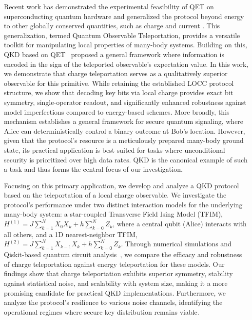 Recent work has demonstrated the experimental feasibility of QET on superconducting quantum hardware \cite{Ikeda2023} and generalized the protocol beyond energy to other globally conserved quantities, such as charge and current \cite{IkedaTeleportingCharge}. This generalization, termed Quantum Observable Teleportation, provides a versatile toolkit for manipulating local properties of many-body systems. Building on this, QKD based on QET~\cite{QKDbyQET} proposed a general framework where information is encoded in the sign of the teleported observable's expectation value. In this work, we demonstrate that charge teleportation serves as a qualitatively superior observable for this primitive. While retaining the established LOCC protocol structure, we show that decoding key bits via local charge provides exact bit symmetry, single-operator readout, and significantly enhanced robustness against model imperfections compared to energy-based schemes. More broadly, this mechanism establishes a general framework for secure quantum signaling, where Alice can deterministically control a binary outcome at Bob's location. However, given that the protocol's resource is a meticulously prepared many-body ground state, its practical application is best suited for tasks where unconditional security is prioritized over high data rates. QKD is the canonical example of such a task and thus forms the central focus of our investigation.

Focusing on this primary application, we develop and analyze a QKD protocol based on the teleportation of a local charge observable. We investigate the protocol's performance under two distinct interaction models for the underlying many-body system: a star-coupled Transverse Field Ising Model (TFIM), $H^{(1)} = J\sum_{k=1}^{N}X_{0}X_{k}+h\sum_{k=0}^{N}Z_{k}$, where a central qubit (Alice) interacts with all others, and a 1D nearest-neighbor TFIM, $H^{(2)} = J\sum_{k=1}^{N}X_{k-1}X_{k}+h\sum_{k=0}^{N}Z_{k}$. Through numerical simulations and Qiskit-based quantum circuit analysis~\cite{Amir_QKD_by_Charge_Teleportation}, we compare the efficacy and robustness of charge teleportation against energy teleportation for these models. Our findings show that charge teleportation exhibits superior symmetry, stability against statistical noise, and scalability with system size, making it a more promising candidate for practical QKD implementations. Furthermore, we analyze the protocol's resilience to various noise channels, identifying the operational regimes where secure key distribution remains viable.

